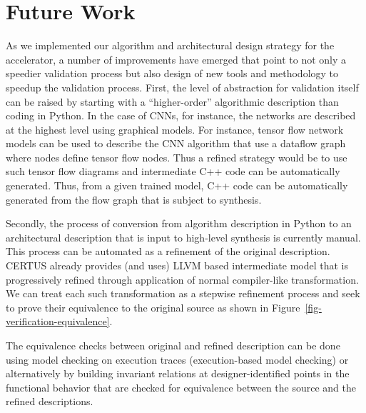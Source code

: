 
\section{Future Work}

As we implemented our algorithm and architectural design strategy for the
accelerator, a number of improvements have emerged that point to not only
a speedier validation process but also design of new tools and
methodology to speedup the validation process. First, the level of
abstraction for validation itself can be raised by starting with a
``higher-order'' algorithmic description than coding in Python. In the
case of CNNs, for instance, the networks are described at the highest
level using graphical models. For instance, tensor flow network models
can be used to describe the CNN algorithm that use a dataflow graph where
nodes define tensor flow nodes. Thus a refined strategy would be to use
such tensor flow diagrams and intermediate C++ code can be automatically
generated. Thus, from a given trained model, C++ code can be
automatically generated from the flow graph that is subject to synthesis.

Secondly, the process of conversion from algorithm description in Python
to an architectural description that is input to high-level synthesis is
currently manual. This process can be automated as a refinement of the
original description. CERTUS already provides (and uses) LLVM based
intermediate model that is progressively refined through application of
normal compiler-like transformation. We can treat each such
transformation as a stepwise refinement process and seek to prove their
equivalence to the original source as shown in
Figure~\ref{fig-verification-equivalence}.



The equivalence checks between original and refined description can be
done using model checking on execution traces (execution-based model
checking) or alternatively by building invariant relations at
designer-identified points in the functional behavior that are checked
for equivalence between the source and the refined descriptions.

